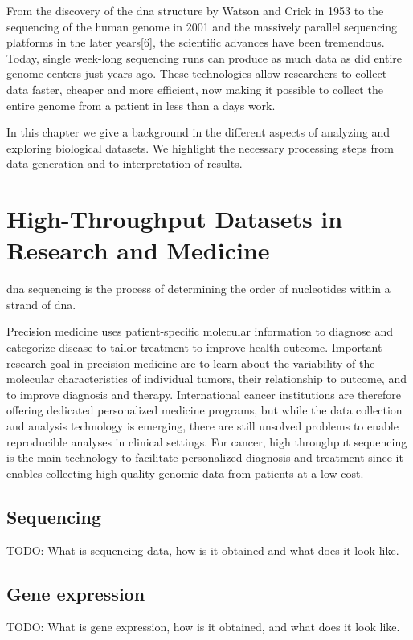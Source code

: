 From the discovery of the \gls{dna} structure by Watson and Crick in
1953\cite{watson1953molecular} to the sequencing of the human genome in 2001
\cite{venter2001sequence,international2001initial} and the massively parallel
sequencing platforms in the later years[6], the scientific advances have been
tremendous. Today, single week-long sequencing runs can produce as much data as
did entire genome centers just years ago.\cite{kahn2011future}  These
technologies allow researchers to collect data faster, cheaper and more
efficient, now making it possible to collect the entire genome from a patient in
less than a days work.

In this chapter we give a background in the different aspects of analyzing and
exploring biological datasets. We highlight the necessary processing steps from
data generation and to interpretation of results. 

\section{High-Throughput Datasets in Research and Medicine} 
\gls{dna} sequencing is the process of determining the order of nucleotides
within a strand of \gls{dna}. 

Precision medicine uses patient-specific molecular information to diagnose and
categorize disease to tailor treatment to improve health
outcome.\cite{national2011toward} Important research goal in precision medicine
are to learn about the variability of the molecular characteristics of
individual tumors, their relationship to outcome, and to improve diagnosis and
therapy.\cite{tannock2016limits} International cancer institutions are therefore
offering dedicated personalized medicine programs, but while the data collection
and analysis technology is emerging, there are still unsolved problems to enable
reproducible analyses in clinical settings. For cancer, high throughput
sequencing is the main technology to facilitate personalized diagnosis and
treatment since it enables collecting high quality genomic data from patients
at a low cost. 

\subsection{Sequencing} 
TODO: What is sequencing data, how is it obtained and what does it look like. 
\subsection{Gene expression} 
TODO: What is gene expression, how is it obtained, and what does it look like.

